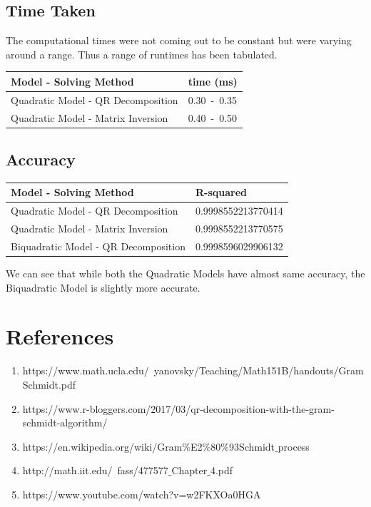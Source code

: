 \documentclass[11pt]{article}
\begin{document}
\subsection{Time Taken}
The computational times were not coming out to be constant but were varying around a range. Thus a range of runtimes has been tabulated.
\begin{table} [h!]
	\centering
	\begin{tabular}{| l | l |}
		\hline
		Model - Solving Method & time (ms)\\
		\hline \hline
		Quadratic Model - QR Decomposition & 0.30~-~0.35 \\
		\hline 
		Quadratic Model - Matrix Inversion & 0.40~-~0.50 \\
		\hline 
	\end{tabular}
\end{table}

\subsection{Accuracy}
\begin{table} [h!]
	\centering
	\begin{tabular}{| l | l |}
		\hline
		Model - Solving Method & R-squared\\
		\hline \hline
		Quadratic Model - QR Decomposition & 0.9998552213770414 \\
		\hline 
		Quadratic Model - Matrix Inversion & 0.9998552213770575 \\
		\hline 
		Biquadratic Model - QR Decomposition & 0.9998596029906132 \\
		\hline 
	\end{tabular}
\end{table}
We can see that while both the Quadratic Models have almost same accuracy, the Biquadratic Model is slightly more accurate.
\pagebreak 

\section{References}
\begin{enumerate}
	\item https://www.math.ucla.edu/~yanovsky/Teaching/Math151B/handouts/GramSchmidt.pdf
	\item
	https://www.r-bloggers.com/2017/03/qr-decomposition-with-the-gram-schmidt-algorithm/
	\item
	https://en.wikipedia.org/wiki/Gram$\%$E2$\%$80$\%$93Schmidt$\_$process
	\item
	http://math.iit.edu/~fass/477577$\_$Chapter$\_$4.pdf
	\item
	https://www.youtube.com/watch?v=w2FKXOa0HGA
\end{enumerate}
\end{document}

